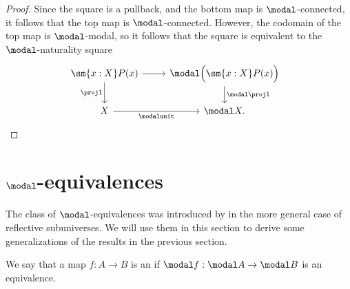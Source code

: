 \documentclass{msc}
\begin{document}
\begin{proof}
  Since the square is a pullback, and the bottom map is $\modal$-connected, it follows that the top map is $\modal$-connected. However, the codomain of the top map is $\modal$-modal, so it follows that the square is equivalent to the $\modal$-naturality square
  \begin{equation*}
    \begin{tikzcd}
      & \sm{x:X}P(x) \arrow[d,swap,"\proj 1"] \arrow[r] & \modal\Big(\sm{x:X}P(x)\Big) \arrow[d,"\modal \proj 1"] & \\
      & X \arrow[r,swap,"\modalunit"] & \modal X. & \qedhere
    \end{tikzcd}
  \end{equation*}
\end{proof}

\section{$\modal$-equivalences}

The class of $\modal$-equivalences was introduced by \cite{CORS} in the more general case of reflective subuniverses. We will use them in this section to derive some generalizations of the results in the previous section.

\begin{defn}
We say that a map $f:A\to B$ is an  if $\modal f:\modal A\to \modal B$ is an equivalence.
\end{defn}
\end{document}
